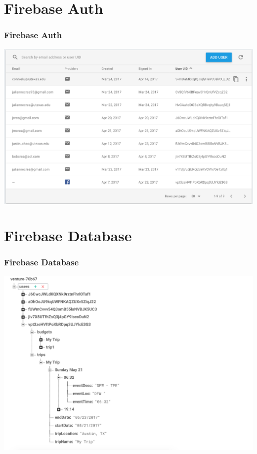 \documentclass{beamer}
\begin{document}
\section{Firebase Auth}
\begin{frame}
\frametitle{Firebase Auth}
    \begin{center}
        \includegraphics[scale=0.33]{firebaseAuth}
    \end{center}
\end{frame}

\section{Firebase Database}
\begin{frame}
\frametitle{Firebase Database}
    \begin{center}
        \includegraphics[scale=0.33]{firebaseDatabase}
    \end{center}
\end{frame}
\end{document}
